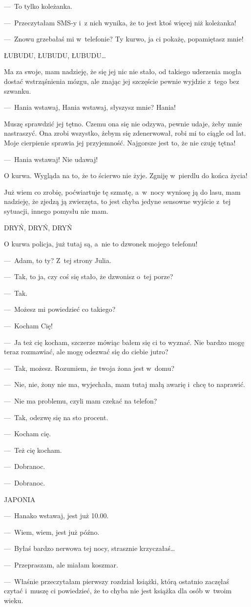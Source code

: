 ---~To tylko koleżanka.

---~Przeczytałam SMS-y i~z nich wynika, że to jest ktoś więcej niż koleżanka!

---~Znowu grzebałaś mi w~telefonie? Ty kurwo, ja ci pokażę, popamiętasz mnie!
 
ŁUBUDU, ŁUBUDU, ŁUBUDU…

Ma za swoje, mam nadzieję, że się jej nic nie stało, od takiego uderzenia mogła dostać wstrząśnienia mózgu, ale znając jej szczęście pewnie wyjdzie z~tego bez szwanku.

---~Hania wstawaj, Hania wstawaj, słyszysz mnie? Hania!

Muszę sprawdzić jej tętno. Czemu ona się nie odzywa, pewnie udaje, żeby mnie nastraszyć. Ona zrobi wszystko, żebym się zdenerwował, robi mi to ciągle od lat. Moje cierpienie sprawia jej przyjemność. Najgorsze jest to, że nie czuję tętna!

---~Hania wstawaj! Nie udawaj!

O kurwa. Wygląda na to, że to ścierwo nie żyje. Zgniję w~pierdlu do końca życia!

Już wiem co zrobię, poćwiartuje tę szmatę, a~w~nocy wyniosę ją do lasu, mam nadzieję, że zjedzą ją zwierzęta, to jest chyba jedyne sensowne wyjście z~tej sytuacji, innego pomysłu nie mam.

DRYŃ, DRYŃ, DRYŃ

O kurwa policja, już tutaj są, a~nie to dzwonek mojego telefonu!

---~Adam, to ty? Z~tej strony Julia.

---~Tak, to ja, czy coś się stało, że dzwonisz o~tej porze?

---~Tak.

---~Możesz mi powiedzieć co takiego?

---~Kocham Cię!

---~Ja też cię kocham, szczerze mówiąc bałem się ci to wyznać. Nie bardzo mogę teraz rozmawiać, ale mogę odezwać się do ciebie jutro?

---~Tak, możesz. Rozumiem, że twoja żona jest w~domu?

---~Nie, nie, żony nie ma, wyjechała, mam tutaj małą awarię i~chcę to naprawić.

---~Nie ma problemu, czyli mam czekać na telefon?

---~Tak, odezwę się na sto procent.

---~Kocham cię.

---~Też cię kocham.

---~Dobranoc.

---~Dobranoc.

\paraSep
 
JAPONIA
 
---~Hanako wstawaj, jest już 10.00.

---~Wiem, wiem, jest już późno.

---~Byłaś bardzo nerwowa tej nocy, strasznie krzyczałaś…

---~Przepraszam, ale miałam koszmar.

---~Właśnie przeczytałam pierwszy rozdział książki, którą ostatnio zaczęłaś czytać i~muszę ci powiedzieć, że to chyba nie jest książka dla osób w~twoim wieku.
